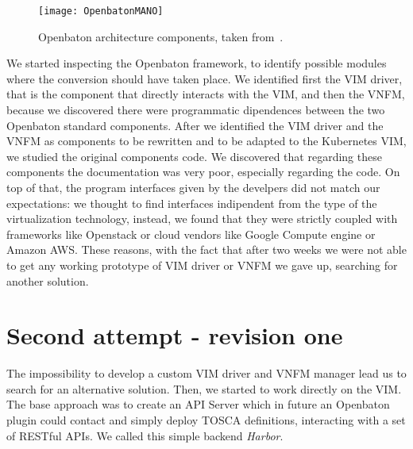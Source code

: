 \begin{figure}[t]
  \centering
  \texttt{[image: OpenbatonMANO]}
  \caption[Openbaton architecture components]{Openbaton architecture components,
    taken from~\cite{openbatondocumentation}.}
  \label{chap:archimpl:sec:secondattempt:img:openbatonMANO}
\end{figure}

We started inspecting the Openbaton framework, to identify possible modules
where the conversion should have taken place. We identified first the VIM
driver, that is the component that directly interacts with the VIM, and then the
VNFM, because we discovered there were programmatic dipendences between the two
Openbaton standard components. After we identified the VIM driver and the VNFM
as components to be rewritten and to be adapted to the Kubernetes VIM, we
studied the original components code. We discovered that regarding these
components the documentation was very poor, especially regarding the code. On
top of that, the program interfaces given by the develpers did not match our
expectations: we thought to find interfaces indipendent from the type of the
virtualization technology, instead, we found that they were strictly coupled
with frameworks like Openstack or cloud vendors like Google Compute engine or
Amazon AWS. These reasons, with the fact that after two weeks we were not able
to get any working prototype of VIM driver or VNFM we gave up, searching for
another solution.

\section{Second attempt - revision one}

The impossibility to develop a custom VIM driver and VNFM manager lead us to
search for an alternative solution. Then, we started to work directly on the
VIM. The base approach was to create an API Server which in future an Openbaton
plugin could contact and simply deploy TOSCA definitions, interacting with a set
of RESTful APIs. We called this simple backend \emph{Harbor}.

